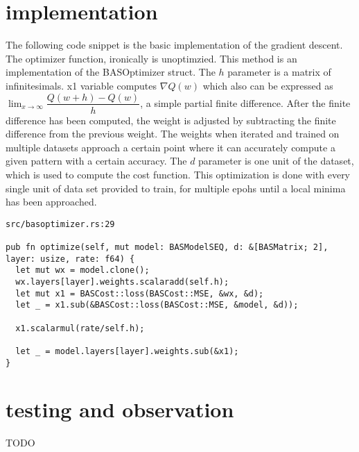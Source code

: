 \documentclass[a4paper,11pt]{article}
\begin{document}
  \section{implementation}
  The following code snippet is the basic implementation of the gradient descent. 
  The optimizer function, ironically is unoptimzied. 
  This method is an implementation of the BASOptimizer struct. The \(h\) parameter is a matrix of infinitesimals.
  x1 variable computes \(\nabla Q(w)\) which also can be expressed as
  \(\lim_{x \to \infty}\dfrac{Q(w+h)-Q(w)}{h}\), a simple partial finite difference.
  After the finite difference has been computed, the weight is adjusted by subtracting the finite difference from the previous weight. The weights when iterated and trained on multiple datasets approach a certain point where it can accurately compute a given pattern with a certain accuracy. 
  The \(d\) parameter is one unit of the dataset, which is used to compute the 
  cost function. This optimization is done with every single unit of data set provided to train, for multiple epohs until a local minima has been approached.
  \begin{verbatim}
src/basoptimizer.rs:29

pub fn optimize(self, mut model: BASModelSEQ, d: &[BASMatrix; 2], layer: usize, rate: f64) {
  let mut wx = model.clone();
  wx.layers[layer].weights.scalaradd(self.h);
  let mut x1 = BASCost::loss(BASCost::MSE, &wx, &d);
  let _ = x1.sub(&BASCost::loss(BASCost::MSE, &model, &d));

  x1.scalarmul(rate/self.h);

  let _ = model.layers[layer].weights.sub(&x1);
}
    \end{verbatim}
  
    \section{testing and observation}
    TODO
\end{document}
